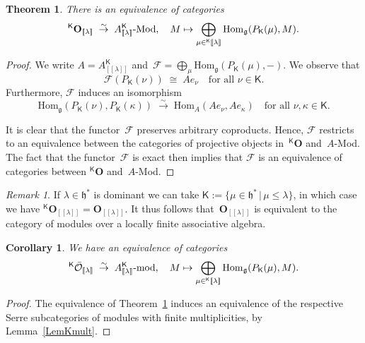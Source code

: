 \documentclass[11pt]{amsart}
\newcommand{\Ffun}{\mathscr{F}}
\newcommand{\lbra}{[\![}
\newcommand{\rbra}{]\!]}
\newcommand{\KKK}{\mathsf{K}}
\newcommand{\cO}{\mathcal O}
\newcommand{\bO}{\mathbf{O}}
\newcommand{\Hom}{\mathrm{Hom}}
\newcommand{\fg}{\mathfrak{g}}
\newcommand{\fh}{\mathfrak{h}}
\numberwithin{equation}{section}
\theoremstyle{plain}
\newtheorem{cor}[subsubsection]{Corollary}
\newtheorem{thm}[subsubsection]{Theorem}
\theoremstyle{remark}
\newtheorem{rem}[subsubsection]{Remark}
\theoremstyle{remark}
\theoremstyle{construction}
\begin{document}
\begin{thm}\label{ThmAMod}
{There is} an equivalence of categories
$${}^{\KKK}\bO_{\lbra\lambda\rbra}\;\stackrel{\sim}{\to}\; A^{\KKK}_{\lbra\lambda\rbra}\mbox{{\rm -Mod}},\quad M\mapsto \bigoplus_{\mu\in {}^{\KKK}\lbra\lambda\rbra}\Hom_{\fg}(P_{\KKK}(\mu),M).$$
\end{thm}
\begin{proof}
We write $A=A^{\KKK}_{\lbra\lambda\rbra}$ and~$\Ffun=\bigoplus_{\mu}\Hom_{\fg}(P_{\KKK}(\mu),-)$.
We observe that
$$\Ffun(P_{\KKK}(\nu))\;\cong\; Ae_{\nu}\quad\mbox{for all $\nu\in\KKK$.}$$
Furthermore, $\Ffun$ induces an isomorphism
$$\Hom_{\fg}(P_{\KKK}(\nu),P_{\KKK}(\kappa))\;\stackrel{\sim}{\to}\; \Hom_A(Ae_{\nu},Ae_{\kappa})\quad\mbox{for all $\nu,\kappa\in\KKK$.}$$

It is clear that the functor~$\Ffun$ preserves arbitrary coproducts. Hence, $\Ffun$ restricts to an equivalence between the categories of projective objects in~${}^{\KKK}\bO$ and~$A$-Mod. The fact that the functor~$\Ffun$ is exact then implies that $\Ffun$ is an equivalence of categories between  ${}^{\KKK}\bO$ and~$A$-Mod.
 \end{proof}


\begin{rem}\label{RemDomA}
{If} $\lambda\in\fh^\ast$ is dominant we can take $\KKK:=\{\mu\in\fh^\ast\,|\, \mu\le\lambda\}$, in which case we have ${}^{\KKK}\bO_{\lbra\lambda\rbra}=\bO_{\lbra\lambda\rbra}$. It thus follows that~$\bO_{\lbra\lambda\rbra}$ is equivalent to the category of modules over a locally finite associative algebra.
\end{rem}



\begin{cor}\label{CorAmod}
{We have} an equivalence of categories
$${}^{\KKK}\bar{\cO}_{\lbra\lambda\rbra}\;\stackrel{\sim}{\to}\; A^{\KKK}_{\lbra\lambda\rbra}\mbox{{\rm -mod}},\quad M\mapsto \bigoplus_{\mu\in {}^{\KKK}\lbra\lambda\rbra}\Hom_{\fg}(P_{\KKK}(\mu),M).$$
\end{cor}
\begin{proof}
{T}he equivalence of Theorem~\ref{ThmAMod} {induces an equivalence of the respective} Serre subcategories of modules with finite multiplicities, by Lemma~\ref{LemKmult}.
\end{proof}
\end{document}
